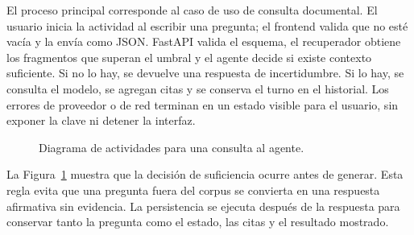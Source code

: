 El proceso principal corresponde al caso de uso de consulta documental. El usuario inicia la actividad al escribir una
pregunta; el frontend valida que no esté vacía y la envía como JSON. FastAPI valida el esquema, el recuperador obtiene
los fragmentos que superan el umbral y el agente decide si existe contexto suficiente. Si no lo hay, se devuelve una
respuesta de incertidumbre. Si lo hay, se consulta el modelo, se agregan citas y se conserva el turno en el historial.
Los errores de proveedor o de red terminan en un estado visible para el usuario, sin exponer la clave ni detener la
interfaz.

\begin{figure}[H]
\centering
{}
\caption{Diagrama de actividades para una consulta al agente.}
\label{fig:actividad_consulta}
\end{figure}

La Figura~\ref{fig:actividad_consulta} muestra que la decisión de suficiencia ocurre antes de generar. Esta regla evita
que una pregunta fuera del corpus se convierta en una respuesta afirmativa sin evidencia. La persistencia se ejecuta
después de la respuesta para conservar tanto la pregunta como el estado, las citas y el resultado mostrado.

